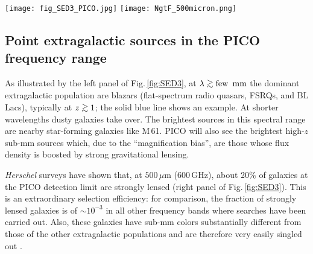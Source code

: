 \documentclass[11pt,a4paper]{article}
\def\simgt{\mathrel{\rlap{\lower 3pt\hbox{$\sim$}} \raise2.0pt\hbox{$>$}}}
\begin{document}






\begin{figure*}
\begin{center}
\texttt{[image: fig\_SED3\_PICO.jpg]}
\texttt{[image: NgtF\_500micron.png]}
\caption{\textbf{Left panel.} Examples of SEDs of extragalactic sources detectable by PICO,
compared with its point source detection limits (solid black line). The SED of M\,61 has been scaled down by a
factor of 10. The 90\% completeness limits of the Second \textit{Planck} Catalogue of Compact Sources (PCCS2; \cite{PCCS2})
are also shown.  \textbf{Right panel.} Integral counts of the various populations of extragalactic sources at
$500\,\mu$m as determined by \textit{Herschel} surveys. The vertical red line shows the estimated PICO detection limit.}
\label{fig:SED3}
\end{center}
\end{figure*}

\subsection{Point extragalactic sources in the PICO frequency range}

As illustrated by the left panel of Fig.\,\ref{fig:SED3}, at $\lambda \simgt
\hbox{few\, mm}$ the  dominant extragalactic population are blazars
(flat-spectrum radio quasars, FSRQs, and BL Lacs), typically at $z\simgt 1$;
the solid blue line shows an example. At shorter wavelengths dusty galaxies
take over. The brightest sources in this spectral range are nearby
star-forming galaxies like M\,61. PICO will also see the brightest high-$z$
sub-mm sources which, due to the ``magnification bias'', are those whose flux
density is boosted by strong gravitational lensing.

\textit{Herschel} surveys have shown that, at $500\,\mu$m (600\,GHz), about
20\% of galaxies  at the PICO detection limit are strongly lensed (right panel
of Fig.\,\ref{fig:SED3}). This is an extraordinary selection efficiency: for
comparison, the fraction of strongly lensed galaxies is of $\sim 10^{-3}$ in
all other frequency bands where searches have been carried out. Also, these
galaxies have sub-mm colors substantially different from those of the other
extragalactic populations and are therefore very easily singled out
\cite{Negrello2017lensed}.
\end{document}
